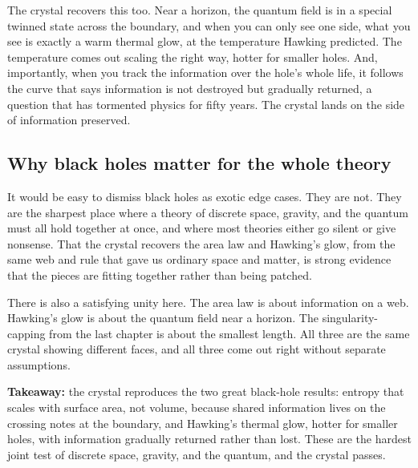 The crystal recovers this too. Near a horizon, the quantum field is in a special twinned state across the boundary, and when you can only see one side, what you see is exactly a warm thermal glow, at the temperature Hawking predicted. The temperature comes out scaling the right way, hotter for smaller holes. And, importantly, when you track the information over the hole's whole life, it follows the curve that says information is not destroyed but gradually returned, a question that has tormented physics for fifty years. The crystal lands on the side of information preserved.

\subsection{Why black holes matter for the whole theory}

It would be easy to dismiss black holes as exotic edge cases. They are not. They are the sharpest place where a theory of discrete space, gravity, and the quantum must all hold together at once, and where most theories either go silent or give nonsense. That the crystal recovers the area law and Hawking's glow, from the same web and rule that gave us ordinary space and matter, is strong evidence that the pieces are fitting together rather than being patched.

There is also a satisfying unity here. The area law is about information on a web. Hawking's glow is about the quantum field near a horizon. The singularity-capping from the last chapter is about the smallest length. All three are the same crystal showing different faces, and all three come out right without separate assumptions.

\textbf{Takeaway:} the crystal reproduces the two great black-hole results: entropy that scales with surface area, not volume, because shared information lives on the crossing notes at the boundary, and Hawking's thermal glow, hotter for smaller holes, with information gradually returned rather than lost. These are the hardest joint test of discrete space, gravity, and the quantum, and the crystal passes.
